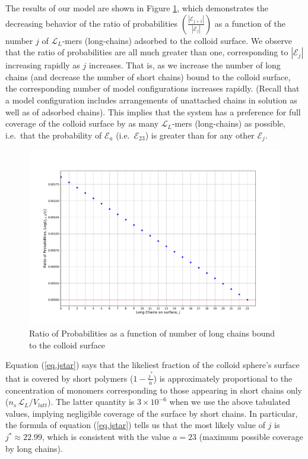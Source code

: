 \documentclass[journal=mamobx,manuscript=article]{achemso}
\newcommand{\leng}{\mathcal{L}}
\begin{document}
The results of our model are shown in Figure \ref{figure 11}, which demonstrates the decreasing behavior of the ratio of probabilities 
$\left(\frac{|\mathcal{E}_{j+1}|}{|\mathcal{E}_j|}\right)$ as a function of the number $j$ of $\leng_L$-mers (long-chains) adsorbed to the colloid surface. We observe that the ratio of probabilities %
are all much
greater than one, corresponding to $|\mathcal{E}_j|$ 
increasing rapidly as $j$ increases.
That is, as we increase the number of long chains
(and decrease the number of short chains)
bound to the colloid surface, the corresponding number of model configurations increases rapidly.  (Recall that a model configuration includes arrangements of unattached chains in solution as well as of adsorbed chains). 
This implies that the system has a preference for full coverage of the colloid surface by as many $\leng_L$-mers (long-chains) as possible, i.e.\ that the probability of $\mathcal{E}_a$ (i.e.\ $\mathcal{E}_{23}$) is greater than for any other $\mathcal{E}_j$.  


\begin{figure}[H]
\centering
\includegraphics[scale=0.45]{Figure_LONGSHORT.pdf}
\caption{Ratio of Probabilities as a function of number of long chains bound to the colloid surface}
\label{figure 11}
\end{figure}

Equation (\ref{eq.jstar}) says that the likeliest fraction of the colloid sphere's surface that is covered by short polymers ($1-\frac{j^*}{a}$) is approximately proportional to the concentration of monomers corresponding to those appearing in short chains only
($n_s\,\leng_L/V_{latt}$).  The latter quantity is $3\times 10^{-6}$ when we use the above tabulated values, implying negligible coverage of the surface by short chains.  In particular, the formula of equation (\ref{eq.jstar}) tells us that the most likely value of $j$ is $j^*\approx 22.99$, which is consistent with the value $a=23$ (maximum possible coverage by long chains).
\end{document}

